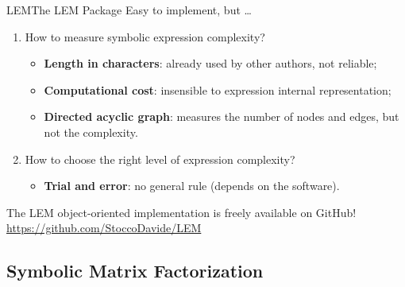 \begin{frame}{\acl{LEM}}{The \ac{LEM} Package}
  Easy to implement, but \dots
  \begin{enumerate}
    \item How to measure symbolic expression complexity?
    \begin{itemize}
      \item \textbf{Length in characters}: already used by other authors, not reliable;
      \item \textbf{Computational cost}: insensible to expression internal representation;
      \item \textbf{Directed acyclic graph}: measures the number of nodes and edges, but not the complexity.
    \end{itemize}
    \item How to choose the right level of expression complexity?
    \begin{itemize}
      \item \textbf{Trial and error}: no general rule (depends on the software).
    \end{itemize}
  \end{enumerate}
  \begin{bbox}
    The \ac{LEM} object-oriented implementation is freely available on GitHub! \\
    \centering \url{https://github.com/StoccoDavide/LEM}
  \end{bbox}
\end{frame}

\subsection{Symbolic Matrix Factorization}

